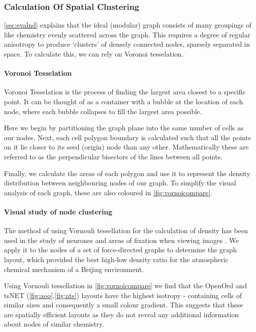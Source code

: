 \subsubsection{Calculation Of Spatial Clustering}\label{sec:nodedensitya}
\autoref{sec:evalnd} explains that the ideal (modular) graph consists of many groupings of like chemistry evenly scattered across the graph.  This requires a degree of regular anisotropy to produce `clusters' of densely connected nodes, sparsely separated in space. To calculate this, we can rely on Voronoi tesselation. 



\paragraph*{Voronoi Tesselation}
Voronoi Tesselation is the process of finding the largest area closest to a specific point. It can be thought of as a container with a bubble at the location of each node, where each bubble collapses to fill the largest area possible.

Here we begin by partitioning the graph plane into the same number of cells as our nodes. Next, each cell polygon boundary is calculated such that all the points on it lie closer to its seed (origin) node than any other. Mathematically these are referred to as the perpendicular bisectors of the lines between all points. 

Finally, we calculate the areas of each polygon and use it to represent the density distribution between neighbouring nodes of our graph. To simplify the visual analysis of each graph, these are also coloured in \autoref{fig:vornoicompare}. 


\paragraph*{Visual study of node clustering}

The method of using Vornouli tessellation for the calculation of density has been used in the study of neurones \citep{neurone} and areas of fixation when viewing images \citep{fixation}. We apply it to the nodes of a set of force-directed graphs to determine the graph layout, which provided the best high-low density ratio for the atmospheric chemical mechanism of a Beijing environment.
 
Using Vornouli tessellation in \autoref{fig:vornoicompare} we find that 
the OpenOrd and tsNET (\autoref{fig:aoo},\autoref{fig:ats}) layouts have the highest isotropy - containing cells of similar sizes and consequently a small colour gradient. This suggests that these are spatially efficient layouts as they do not reveal any additional information about nodes of similar chemistry. 

